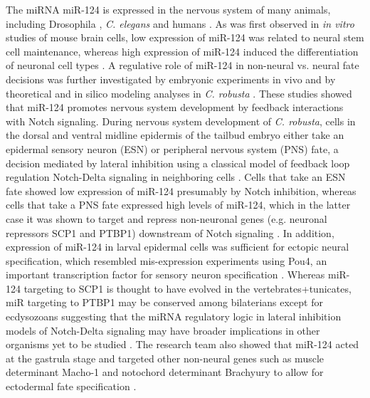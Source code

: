 \documentclass[graybox]{svmult}
\begin{document}
The miRNA miR-124 is expressed in the nervous system of many animals, including 
Drosophila \cite{Aboobaker18017}, \textit{C. elegans} \cite{Clark:2010} and 
humans \cite{Sempere2004}. As was first observed in \textit{in vitro} studies 
of mouse 
brain cells, low expression of miR-124 was related to neural stem cell 
maintenance, whereas high expression of miR-124 induced the differentiation of 
neuronal cell types \cite{Cheng:2009qf}. A regulative role of 
miR-124 in non-neural vs. neural fate decisions was further investigated by 
embryonic experiments in vivo \cite{Chen4943} and by 
theoretical and in silico modeling analyses in \textit{C. robusta} 
\cite{Chen2014}. These studies showed that miR-124 promotes 
nervous system development by feedback interactions with Notch signaling. 
During nervous system development of \textit{C. robusta}, cells in the dorsal 
and ventral midline epidermis of the tailbud embryo either take an epidermal 
sensory neuron (ESN) or peripheral nervous system (PNS) fate, a decision 
mediated by lateral inhibition using a classical model of feedback loop 
regulation Notch-Delta signaling in neighboring cells \cite{Collier:1996, 
Chen2014}. Cells that take an ESN fate showed low expression of miR-124 
presumably by Notch inhibition, whereas cells that take a PNS fate expressed 
high levels of miR-124, which in the latter case it was shown to target and 
repress non-neuronal genes (e.g. neuronal repressors SCP1 and PTBP1) downstream 
of Notch signaling \cite{Chen4943}. In addition, expression 
of miR-124 in larval epidermal cells was sufficient for ectopic neural 
specification, which resembled mis-expression experiments using Pou4, an 
important transcription factor for sensory neuron specification 
\cite{Chen4943, JoyceTang2013}. Whereas miR-124 targeting to SCP1 is thought to 
have evolved in the vertebrates+tunicates, miR targeting to PTBP1 may be 
conserved among bilaterians except for ecdysozoans \cite{Chen4943} suggesting 
that the miRNA regulatory logic in lateral inhibition models of Notch-Delta 
signaling may have broader implications in other organisms yet to be studied 
\cite{Chen2014}. The research team also showed that miR-124 
acted at the gastrula stage and targeted other non-neural genes such as muscle 
determinant Macho-1 and notochord determinant Brachyury to allow for ectodermal 
fate specification \cite{Chen4943}.
\end{document}
